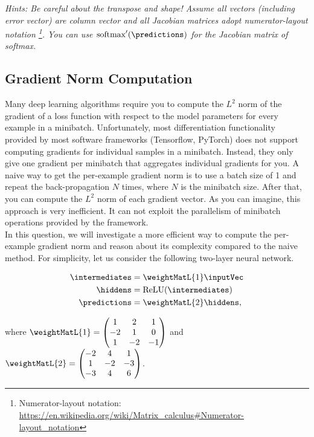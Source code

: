     \noindent \emph{Hints: Be careful about the transpose and shape! Assume all vectors (including error vector) are column vector and all Jacobian matrices adopt numerator-layout notation \footnote{Numerator-layout notation: \url{https://en.wikipedia.org/wiki/Matrix_calculus\#Numerator-layout_notation}}. You can use $\text{softmax}^\prime(\predictions)$ for the Jacobian matrix of softmax.}

\subsection{Gradient Norm Computation}
Many deep learning algorithms require you to compute the $L^2$ norm of the gradient of a loss function with respect to the model parameters for every example in a minibatch. Unfortunately, most differentiation functionality provided by most software frameworks (Tensorflow, PyTorch) does not support computing gradients for individual samples in a minibatch. Instead, they only give one gradient per minibatch that aggregates individual gradients for you. A naive way to get the per-example gradient norm is to use a batch size of 1 and repeat the back-propagation $N$ times, where $N$ is the minibatch size. After that, you can compute the $L^2$ norm of each gradient vector. As you can imagine, this approach is very inefficient. It can not exploit the parallelism of minibatch operations provided by the framework. \\

In this question, we will investigate a more efficient way to compute the per-example gradient norm and reason about its complexity compared to the naive method. For simplicity, let us consider the following two-layer neural network.

\begin{align*}
    \intermediates &= \weightMatL{1} \inputVec \\
    \hiddens &= \textnormal{ReLU}(\intermediates) \\
    \predictions &= \weightMatL{2} \hiddens,\\
\end{align*}

\noindent where $\weightMatL{1} = \begin{pmatrix}
            1 & 2 & 1 \\
            -2 & 1 & 0 \\
            1 & -2 & -1 \\
            \end{pmatrix}$
and $\weightMatL{2} = \begin{pmatrix}
            -2 & 4 & 1\\
            1 & -2 & -3\\
            -3 & 4 & 6
            \end{pmatrix}$.

